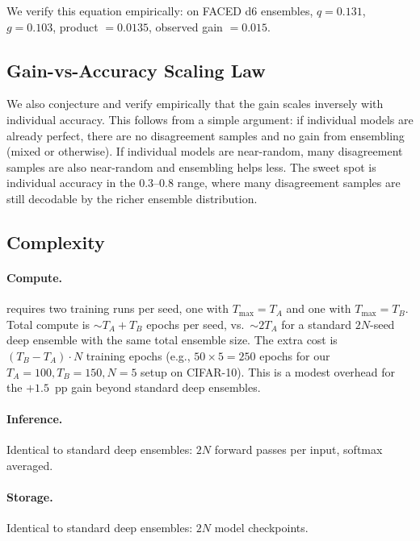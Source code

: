 We verify this equation empirically: on FACED d6 ensembles, $q = 0.131$,
$g = 0.103$, product $= 0.0135$, observed gain $= 0.015$.

\subsection{Gain-vs-Accuracy Scaling Law}

We also conjecture and verify empirically that the gain scales inversely
with individual accuracy. This follows from a simple argument: if
individual models are already perfect, there are no disagreement samples
and no gain from ensembling (mixed or otherwise). If individual models are
near-random, many disagreement samples are also near-random and ensembling
helps less. The sweet spot is individual accuracy in the 0.3--0.8 range,
where many disagreement samples are still decodable by the richer
ensemble distribution.

\subsection{Complexity}

\paragraph{Compute.} \ours{} requires two training runs per seed, one with
$T_\mathrm{max}=T_A$ and one with $T_\mathrm{max}=T_B$. Total compute is
$\sim\!T_A + T_B$ epochs per seed, vs.\ $\sim\!2T_A$ for a standard $2N$-seed
deep ensemble with the same total ensemble size. The extra cost is
$(T_B - T_A) \cdot N$ training epochs (e.g., $50 \times 5 = 250$ epochs
for our $T_A=100, T_B=150, N=5$ setup on CIFAR-10). This is a modest
overhead for the $+1.5$~pp gain beyond standard deep ensembles.

\paragraph{Inference.} Identical to standard deep ensembles: $2N$ forward
passes per input, softmax averaged.

\paragraph{Storage.} Identical to standard deep ensembles: $2N$ model
checkpoints.

